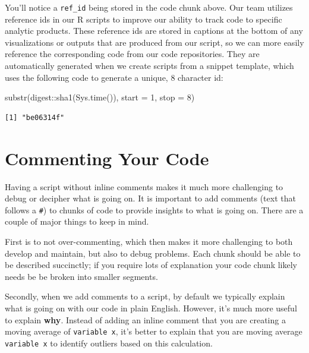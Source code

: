 \documentclass[
  letterpaper,
  DIV=11,
  numbers=noendperiod]{scrreprt}
\newenvironment{Shaded}{\begin{snugshade}}{\end{snugshade}}
\newcommand{\AttributeTok}[1]{\textcolor[rgb]{0.40,0.45,0.13}{#1}}
\newcommand{\DecValTok}[1]{\textcolor[rgb]{0.68,0.00,0.00}{#1}}
\newcommand{\FunctionTok}[1]{\textcolor[rgb]{0.28,0.35,0.67}{#1}}
\newcommand{\NormalTok}[1]{\textcolor[rgb]{0.00,0.23,0.31}{#1}}
\newcommand{\SpecialCharTok}[1]{\textcolor[rgb]{0.37,0.37,0.37}{#1}}
\begin{document}
You'll notice a \texttt{ref\_id} being stored in the code chunk above.
Our team utilizes reference ids in our R scripts to improve our ability
to track code to specific analytic products. These reference ids are
stored in captions at the bottom of any visualizations or outputs that
are produced from our script, so we can more easily reference the
corresponding code from our code repositories. They are automatically
generated when we create scripts from a snippet template, which uses the
following code to generate a unique, 8 character id:

\begin{Shaded}
\begin{Highlighting}[]
\FunctionTok{substr}\NormalTok{(digest}\SpecialCharTok{::}\FunctionTok{sha1}\NormalTok{(}\FunctionTok{Sys.time}\NormalTok{()), }\AttributeTok{start =} \DecValTok{1}\NormalTok{, }\AttributeTok{stop =} \DecValTok{8}\NormalTok{)}
\end{Highlighting}
\end{Shaded}

\begin{verbatim}
[1] "be06314f"
\end{verbatim}

\hypertarget{commenting-your-code}{%
\section{Commenting Your Code}\label{commenting-your-code}}

Having a script without inline comments makes it much more challenging
to debug or decipher what is going on. It is important to add comments
(text that follows a \texttt{\#}) to chunks of code to provide insights
to what is going on. There are a couple of major things to keep in mind.

First is to not over-commenting, which then makes it more challenging to
both develop and maintain, but also to debug problems. Each chunk should
be able to be described succinctly; if you require lots of explanation
your code chunk likely needs be be broken into smaller segments.

Secondly, when we add comments to a script, by default we typically
explain what is going on with our code in plain English. However, it's
much more useful to explain \textbf{why}. Instead of adding an inline
comment that you are creating a moving average of \texttt{variable\ x},
it's better to explain that you are moving average \texttt{variable\ x}
to identify outliers based on this calculation.
\end{document}
